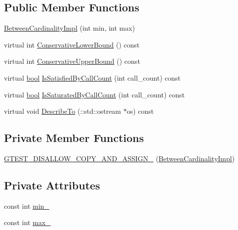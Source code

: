 \subsection*{Public Member Functions}
\begin{DoxyCompactItemize}
\item 
\hyperlink{classtesting_1_1anonymous__namespace_02gmock-cardinalities_8cc_03_1_1BetweenCardinalityImpl_a4dfb0c608c068f816775ecc513a2f7b9}{Between\+Cardinality\+Impl} (int min, int max)
\item 
virtual int \hyperlink{classtesting_1_1anonymous__namespace_02gmock-cardinalities_8cc_03_1_1BetweenCardinalityImpl_ab1e15ef66d93b5080bc8e15ec40248bb}{Conservative\+Lower\+Bound} () const
\item 
virtual int \hyperlink{classtesting_1_1anonymous__namespace_02gmock-cardinalities_8cc_03_1_1BetweenCardinalityImpl_a56bf485881a7ccb217f98f0f83b23577}{Conservative\+Upper\+Bound} () const
\item 
virtual \hyperlink{classbool}{bool} \hyperlink{classtesting_1_1anonymous__namespace_02gmock-cardinalities_8cc_03_1_1BetweenCardinalityImpl_aba73001c6442fb7d37b4a11d92b8e9b8}{Is\+Satisfied\+By\+Call\+Count} (int call\+\_\+count) const
\item 
virtual \hyperlink{classbool}{bool} \hyperlink{classtesting_1_1anonymous__namespace_02gmock-cardinalities_8cc_03_1_1BetweenCardinalityImpl_add59b47271e1dc87cf2cde64ecf9ff9e}{Is\+Saturated\+By\+Call\+Count} (int call\+\_\+count) const
\item 
virtual void \hyperlink{classtesting_1_1anonymous__namespace_02gmock-cardinalities_8cc_03_1_1BetweenCardinalityImpl_a8768e68b374d5a1103890284ea4fe332}{Describe\+To} (\+::std\+::ostream $\ast$os) const
\end{DoxyCompactItemize}
\subsection*{Private Member Functions}
\begin{DoxyCompactItemize}
\item 
\hyperlink{classtesting_1_1anonymous__namespace_02gmock-cardinalities_8cc_03_1_1BetweenCardinalityImpl_a2b97d2a30a5d86db1cec0a6b3e83588a}{G\+T\+E\+S\+T\+\_\+\+D\+I\+S\+A\+L\+L\+O\+W\+\_\+\+C\+O\+P\+Y\+\_\+\+A\+N\+D\+\_\+\+A\+S\+S\+I\+G\+N\+\_\+} (\hyperlink{classtesting_1_1anonymous__namespace_02gmock-cardinalities_8cc_03_1_1BetweenCardinalityImpl}{Between\+Cardinality\+Impl})
\end{DoxyCompactItemize}
\subsection*{Private Attributes}
\begin{DoxyCompactItemize}
\item 
const int \hyperlink{classtesting_1_1anonymous__namespace_02gmock-cardinalities_8cc_03_1_1BetweenCardinalityImpl_aaa6c70686dc7e205bd949c11b21648e8}{min\+\_\+}
\item 
const int \hyperlink{classtesting_1_1anonymous__namespace_02gmock-cardinalities_8cc_03_1_1BetweenCardinalityImpl_acf6f35b47bf9f52b714ccceb22255aeb}{max\+\_\+}
\end{DoxyCompactItemize}


